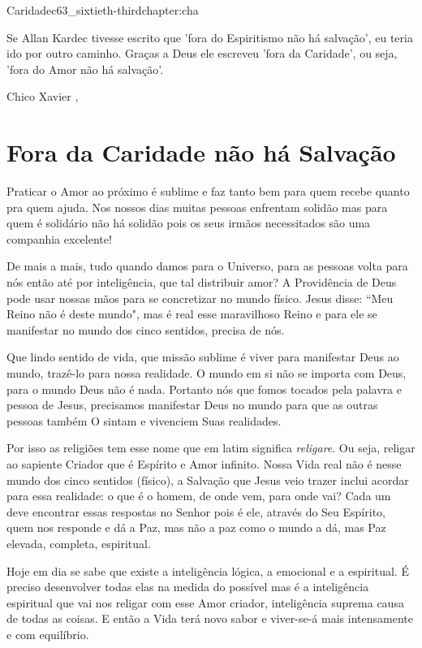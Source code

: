 \begin{chapterpage}{Caridade}{c63_sixtieth-thirdchapter:cha}
 
\begin{myquotation}Se Allan Kardec tivesse escrito que 'fora do Espiritismo não há salvação', eu teria ido por outro caminho. Graças a Deus ele escreveu 'fora da Caridade', ou seja, 'fora do Amor não há salvação'.
\par\vspace*{15mm}
\mbox{}\hfill \emdash{}Chico Xavier
, %
\par\end{myquotation}

\end{chapterpage}



\section{Fora da Caridade não há Salvação}\label{c1_basicformatting:sec}

\emdash{}Praticar o Amor ao próximo é sublime e faz tanto bem para quem recebe quanto pra quem ajuda. Nos nossos dias muitas pessoas enfrentam solidão mas para quem é solidário não há solidão pois os seus irmãos necessitados são uma companhia excelente!

\emdash{}De mais a mais, tudo quando damos para o Universo, para as pessoas volta para nós então até por inteligência, que tal distribuir amor? A Providência de Deus pode usar nossas mãos para se concretizar no mundo físico. Jesus disse: ``Meu Reino não é deste mundo", mas é real esse maravilhoso Reino e para ele se manifestar no mundo dos cinco sentidos, precisa de nós.

\emdash{}Que lindo sentido de vida, que missão sublime é viver para manifestar Deus ao mundo, trazê-lo para nossa realidade. O mundo em si não se importa com Deus, para o mundo Deus não é nada. Portanto nós que fomos tocados pela palavra e pessoa de Jesus, precisamos manifestar Deus no mundo para que as outras pessoas também O sintam e vivenciem Suas realidades.

\emdash{}Por isso as religiões tem esse nome que em latim significa \textit{religare}. Ou seja, religar ao sapiente Criador que é Espírito e Amor infinito. Nossa Vida real não é nesse mundo dos cinco sentidos (físico), a Salvação que Jesus veio trazer inclui acordar para essa realidade: o que é o homem, de onde vem, para onde vai? Cada um deve encontrar essas respostas no Senhor pois é ele, através do Seu Espírito, quem nos responde e dá a Paz, mas não a paz como o mundo a dá, mas Paz elevada, completa, espiritual.

\emdash{}Hoje em dia se sabe que existe a inteligência lógica, a emocional e a espiritual. É preciso desenvolver todas elas na medida do possível mas é a inteligência espiritual que vai nos religar com esse Amor criador, inteligência suprema causa de todas as coisas. E então a Vida terá novo sabor e viver-se-á mais intensamente e com equilíbrio.